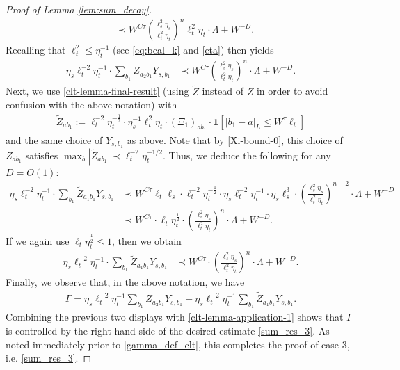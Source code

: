 \begin{proof}[Proof of Lemma \ref{lem:sum_decay}]
{\begin{align*}
&\prec W^{C\tau}\left(\frac{\ell_s^{2} \eta_s}{\ell_t^{2} \eta_t}\right)^{n}\ell_{t}^{2}\eta_{t}\cdot \Lambda + W^{-D}.
\end{align*}
%
Recalling that $\ell_{t}^{2}\leq\eta_{t}^{-1}$ (see \eqref{eq:bcal_k} and \eqref{eta}) then yields
%
\begin{align}
\eta_{s}\ell_{t}^{-2}\eta_{t}^{-1}\cdot\sum_{b_{1}}Z_{a_{2}b_{1}}Y_{s,b_{1}}&\prec W^{C\tau}\left(\frac{\ell_s^{2} \eta_s}{\ell_t^{2} \eta_t}\right)^{n}\cdot \Lambda + W^{-D}.\label{clt-lemma-application-1}
\end{align}
%
Next, we use \eqref{clt-lemma-final-result} (using $\tilde{Z}$ instead of $Z$ in order to avoid confusion with the above notation) with
%
\begin{align*}
\tilde{Z}_{ab_{1}}:=\ell_{t}^{-2}\eta_{t}^{-\frac12}\cdot\eta_{s}^{-1}\ell_{t}^{2}\eta_{t}\cdot (\Xi_{1})_{ab_{1}}\cdot\mathbf{1}[|b_{1}-a|_{L}\leq W^{\tau}\ell_{t}]
\end{align*}
%
and the same choice of $Y_{s,b_{1}}$ as above. Note that by \eqref{Xi-bound-0}, this choice of $\tilde{Z}_{ab_{1}}$ satisfies $\max_{b}|\tilde{Z}_{ab_{1}}|\prec \ell_{t}^{-2}\eta_{t}^{-1/2}$. Thus, we deduce the following for any $D=O(1)$:
%
\begin{align*}
\eta_{s}\ell_{t}^{-2}\eta_{t}^{-1}\cdot \sum_{b_{1}}\tilde{Z}_{a_{1}b_{1}}Y_{s,b_{1}}&\prec W^{C\tau}\ell_{t}\ell_{s}\cdot \ell_{t}^{-2}\eta_{t}^{-\frac12}\cdot \eta_{s}\ell_{t}^{-2}\eta_{t}^{-1}\cdot\eta_{s}\ell_{s}^{3}\cdot \left(\frac{\ell_s^{2} \eta_s}{\ell_t^{2} \eta_t}\right)^{n-2}\cdot \Lambda+W^{-D}\\
&\prec W^{C\tau}\cdot \ell_{t}\eta_{t}^{\frac12} \cdot \left(\frac{\ell_s^{2} \eta_s}{\ell_t^{2} \eta_t}\right)^{n}\cdot \Lambda +W^{-D}.
\end{align*}
%
If we again use $\ell_{t}\eta_{t}^{\frac12}\leq1$, then we obtain
%
\begin{align*}
\eta_{s}\ell_{t}^{-2}\eta_{t}^{-1}\cdot\sum_{b_{1}}\tilde{Z}_{a_{1}b_{1}}Y_{s,b_{1}}&\prec W^{C\tau}\cdot \left(\frac{\ell_s^{2} \eta_s}{\ell_t^{2} \eta_t}\right)^{n}\cdot \Lambda +W^{-D}.
\end{align*}
%
Finally, we observe that, in the above notation, we have 
%
\begin{align*}
\Gamma=\eta_{s}\ell_{t}^{-2}\eta_{t}^{-1}\sum_{b_{1}}Z_{a_{2}b_{1}}Y_{s,b_{1}}+\eta_{s}\ell_{t}^{-2}\eta_{t}^{-1}\sum_{b_{1}}\tilde{Z}_{a_{1}b_{1}}Y_{s,b_{1}}.
\end{align*}
%
Combining the previous two displays with \eqref{clt-lemma-application-1} shows that $\Gamma$ is controlled by the right-hand side of the desired estimate \eqref{sum_res_3}. As noted immediately prior to \eqref{gamma_def_clt}, this completes the proof of case 3, i.e. \eqref{sum_res_3}.

}
\end{proof}
